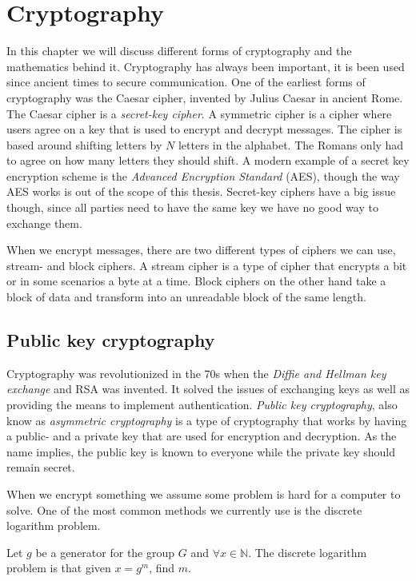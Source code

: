 \chapter{Cryptography\label{crypto}}
In this chapter we will discuss different forms of cryptography and the
mathematics behind it. Cryptography has always been important, it is been used
since ancient times to secure communication. One of the earliest forms of
cryptography was the Caesar cipher, invented by Julius Caesar in ancient Rome.
The Caesar cipher is a \textit{secret-key cipher}. A symmetric cipher is a
cipher where users agree on a key that is used to encrypt and decrypt messages.
The cipher is based around shifting letters by $N$ letters in the alphabet. The
Romans only had to agree on how many letters they should shift. A modern
example of a secret key encryption scheme is the \textit{Advanced Encryption
Standard} (AES), though the way AES works is out of the scope of this thesis.
Secret-key ciphers have a big issue though, since all parties need to have the
same key we have no good way to exchange them.

When we encrypt messages, there are two different types of ciphers we can use,
stream- and block ciphers. A stream cipher is a type of cipher that encrypts a
bit or in some scenarios a byte at a time. Block ciphers on the other hand take
a block of data and transform into an unreadable block of the same length.


\section{Public key cryptography}
Cryptography was revolutionized in the 70s when the \textit{Diffie and Hellman
key exchange} and RSA was invented. It solved the issues of exchanging keys as
well as providing the means to implement authentication. \textit{Public key
cryptography}, also know as \textit{asymmetric cryptography} is a type of
cryptography that works by having a public- and a private key
that are used for encryption and decryption. As the name implies, the public
key is known to everyone while the private key should remain secret.

When we encrypt something we assume some problem is hard for a computer to
solve. One of the most common methods we currently use is the discrete
logarithm problem.

\begin{definition}
    Let $g$ be a generator for the group $G$ and $\forall x \in \mathbb{N}$. The
    discrete logarithm problem is that given $x = g^m$, find $m$.
\end{definition}

